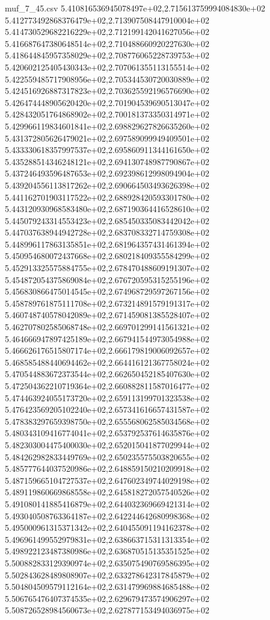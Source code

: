 \begin{filecontents*}{muf_7_45.csv}
5.410816536945078497e+02,2.715613759994084830e+02
5.412773492868376479e+02,2.713907508447910004e+02
5.414730529682216229e+02,2.712199142041627056e+02
5.416687647380648514e+02,2.710488660920227630e+02
5.418644845957358029e+02,2.708776065228739753e+02
5.420602125405430343e+02,2.707061355113155514e+02
5.422559485717908956e+02,2.705344530720030889e+02
5.424516926887317823e+02,2.703625592196576690e+02
5.426474448905620420e+02,2.701904539690513047e+02
5.428432051764868902e+02,2.700181373350314971e+02
5.429966119834601841e+02,2.698829627826635260e+02
5.431372805626479021e+02,2.697589099949409501e+02
5.433330618357997537e+02,2.695860911344161650e+02
5.435288514346248121e+02,2.694130748987790867e+02
5.437246493596487653e+02,2.692398612998094904e+02
5.439204556113817262e+02,2.690664503493626398e+02
5.441162701903117522e+02,2.688928420593301780e+02
5.443120930968583480e+02,2.687190364416528610e+02
5.445079243314553423e+02,2.685450335083442042e+02
5.447037638944942728e+02,2.683708332714759308e+02
5.448996117863135851e+02,2.681964357431461394e+02
5.450954680072437668e+02,2.680218409355584299e+02
5.452913325575884755e+02,2.678470488609191307e+02
5.454872054375869084e+02,2.676720595315255196e+02
5.456830866475014545e+02,2.674968729597267156e+02
5.458789761875111708e+02,2.673214891579191317e+02
5.460748740578042089e+02,2.671459081385528407e+02
5.462707802585068748e+02,2.669701299141561321e+02
5.464666947897425189e+02,2.667941544973054988e+02
5.466626176515807174e+02,2.666179819006092657e+02
5.468585488440694462e+02,2.664416121367758024e+02
5.470544883672373544e+02,2.662650452185407630e+02
5.472504362210719364e+02,2.660882811587016477e+02
5.474463924055173720e+02,2.659113199701323538e+02
5.476423569205102240e+02,2.657341616657431587e+02
5.478383297659398750e+02,2.655568062585034568e+02
5.480343109416774041e+02,2.653792537614635876e+02
5.482303004475400030e+02,2.652015041877029944e+02
5.484262982833449769e+02,2.650235575503820655e+02
5.485777644037520986e+02,2.648859150210209918e+02
5.487159665104727537e+02,2.647602349744029198e+02
5.489119860669868558e+02,2.645818272057540526e+02
5.491080141885416879e+02,2.644032369669421314e+02
5.493040508763364187e+02,2.642244642680998368e+02
5.495000961315371342e+02,2.640455091194162378e+02
5.496961499552979831e+02,2.638663715311313354e+02
5.498922123487380986e+02,2.636870515135351525e+02
5.500882833129390974e+02,2.635075490769586395e+02
5.502843628489808907e+02,2.633278642317845879e+02
5.504804509579112164e+02,2.631479969884685488e+02
5.506765476407374535e+02,2.629679473574906297e+02
5.508726528984560673e+02,2.627877153494036975e+02

\end{filecontents*}
